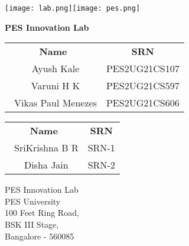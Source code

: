 \documentclass[12pt]{report}
\begin{document}
 

\begin{titlepage}
\texttt{[image: lab.png]}\hfill \texttt{[image: pes.png]}

\begin{center}
\vspace*{1cm}

\textbf{\Large{PES Innovation Lab}}

\vspace{0.3cm}
\vspace{0.1cm}
       
       
\vspace{0.8cm}
            
\vspace{0.8cm}
       
\vspace{0.2cm}
       
\begin{tabular}{c c}    
    \textbf{Name} & 
    \textbf{SRN} \\[0.5cm]
    \ {Ayush Kale} & {PES2UG21CS107} \\
    \ {Varuni H K} & {PES2UG21CS597} \\
    \ {Vikas Paul Menezes} & {PES2UG21CS606} \\         
\end{tabular}
\vspace{0.5cm}

\vspace{0.2cm}
       
\begin{tabular}{c c}
    \textbf{Name} & 
    \textbf{SRN} \\[0.5cm]
    \ {SriKrishna B R} & {SRN-1} \\
    \ {Disha Jain} & {SRN-2} \\
\end{tabular}
       
\vfill
\vspace{0.5cm}
            
PES Innovation Lab\\
PES University\\
100 Feet Ring Road,\\
BSK III Stage,\\
Bangalore - 560085
            
\end{center}
\end{titlepage}
\end{document}
